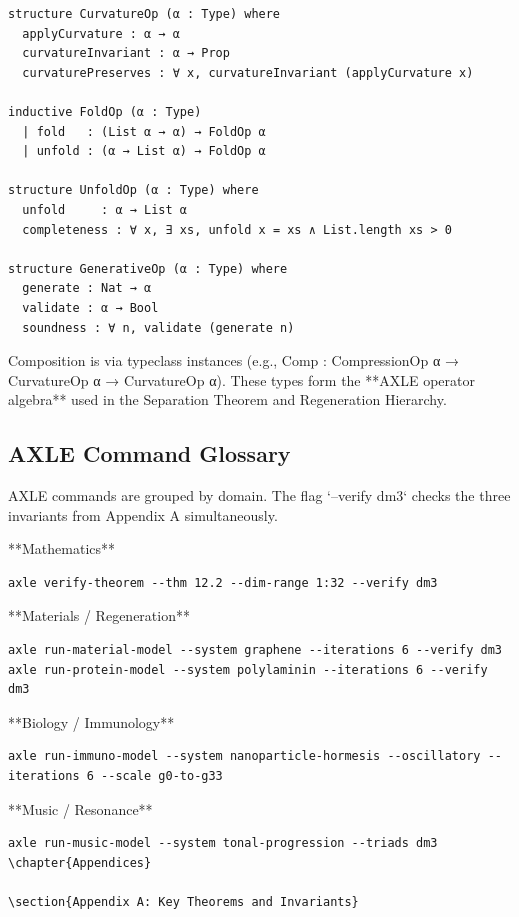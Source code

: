 \documentclass[19pt]{book}
\theoremstyle{plain}
\theoremstyle{definition}
\theoremstyle{remark}
\begin{document}
\begin{enumerate}
\begin{lstlisting}[language=Lean,caption={Core Operator Types in AXLE}]
structure CurvatureOp (α : Type) where
  applyCurvature : α → α
  curvatureInvariant : α → Prop
  curvaturePreserves : ∀ x, curvatureInvariant (applyCurvature x)

inductive FoldOp (α : Type)
  | fold   : (List α → α) → FoldOp α
  | unfold : (α → List α) → FoldOp α

structure UnfoldOp (α : Type) where
  unfold     : α → List α
  completeness : ∀ x, ∃ xs, unfold x = xs ∧ List.length xs > 0

structure GenerativeOp (α : Type) where
  generate : Nat → α
  validate : α → Bool
  soundness : ∀ n, validate (generate n)
\end{lstlisting}

Composition is via typeclass instances (e.g., Comp : CompressionOp α → CurvatureOp α → CurvatureOp α). These types form the **AXLE operator algebra** used in the Separation Theorem and Regeneration Hierarchy.

\subsection{AXLE Command Glossary}

AXLE commands are grouped by domain. The flag `--verify dm3` checks the three invariants from Appendix A simultaneously.

**Mathematics**  
\begin{verbatim}
axle verify-theorem --thm 12.2 --dim-range 1:32 --verify dm3
\end{verbatim}

**Materials / Regeneration**  
\begin{verbatim}
axle run-material-model --system graphene --iterations 6 --verify dm3
axle run-protein-model --system polylaminin --iterations 6 --verify dm3
\end{verbatim}

**Biology / Immunology**  
\begin{verbatim}
axle run-immuno-model --system nanoparticle-hormesis --oscillatory --iterations 6 --scale g0-to-g33
\end{verbatim}

**Music / Resonance**  
\begin{verbatim}
axle run-music-model --system tonal-progression --triads dm3
\chapter{Appendices}

\section{Appendix A: Key Theorems and Invariants}


\end{verbatim}
\end{enumerate}
\end{document}
